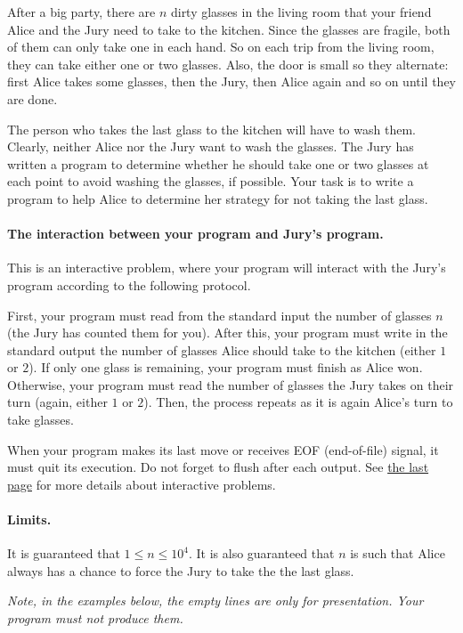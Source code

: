 After a big party, there are $n$ dirty glasses in the living room that your friend Alice and the Jury need to take to the kitchen.
Since the glasses are fragile, both of them can only take one in each hand.
So on each trip from the living room, they can take either one or two glasses.
Also, the door is small so they alternate: first Alice takes some glasses, then the Jury, then Alice again and so on until they are done.

The person who takes the last glass to the kitchen will have to wash them.
Clearly, neither Alice nor the Jury want to wash the glasses.
The Jury has written a program to determine whether he should take one or two glasses at each point to avoid washing the glasses, if possible.
Your task is to write a program to help Alice to determine her strategy for not taking the last glass.

\paragraph{The interaction between your program and Jury's program.}
This is an interactive problem, where your program will interact with the Jury's program according to the following protocol.

First, your program must read from the standard input the number of glasses $n$ (the Jury has counted them for you).
After this, your program must write in the standard output the number of glasses Alice should take to the kitchen (either $1$ or $2$).
If only one glass is remaining, your program must finish as Alice won.
Otherwise, your program must read the number of glasses the Jury takes on their turn (again, either $1$ or $2$).
Then, the process repeats as it is again Alice's turn to take glasses.

When your program makes its last move or receives EOF (end-of-file) signal, it must quit its execution.
Do not forget to flush after each output.
See \hyperlink{info-interactive}{the last page} for more details about interactive problems.

\paragraph{Limits.}
It is guaranteed that $1 \leq n \leq 10^4$.
It is also guaranteed that $n$ is such that Alice always has a chance to force the Jury to take the the last glass.

\emph{Note, in the examples below, the empty lines are only for presentation.
Your program must not produce them.}
{
\renewcommand{\sampleinputname}{Jury's output}
\renewcommand{\sampleoutputname}{Your output}
}